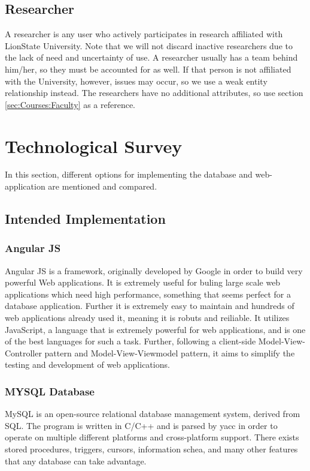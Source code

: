 \documentclass{article}
\begin{document}
  \subsection{Researcher}\label{sec:Courses:Researcher}
    A researcher is any user who actively participates in research affiliated with LionState University.  Note that we will not discard inactive researchers due to the lack of need and uncertainty of use.  A researcher usually has a team behind him/her, so they must be accounted for as well.  If that person is not affiliated with the University, however, issues may occur, so we use a weak entity relationship instead.
    The researchers have no additional attributes, so use section \ref{sec:Courses:Faculty} as a reference.

  \newpage


  \section{Technological Survey}\label{sec:Tech}
    In this section, different options for implementing the database and web-application are mentioned and compared.

    \subsection{Intended Implementation}\label{sec:Tech:intent}

    \subsubsection{Angular JS}
      Angular JS is a framework, originally developed by Google in order to build very powerful Web applications.  It is extremely useful for buling large scale web applications which need high performance, something that seems perfect for a database application.  Further it is extremely easy to maintain and hundreds of web applications already used it, meaning it is robuts and reiliable.  It utilizes JavaScript, a language that is extremely powerful for web applications, and is one of the best languages for such a task.  Further, following a client-side Model-View-Controller pattern and Model-View-Viewmodel pattern, it aims to simplify the testing and development of web applications.

    \subsubsection{MYSQL Database}
      MySQL is an open-source relational database management system, derived from SQL.  The program is written in C/C++ and is parsed by yacc in order to operate on multiple different platforms and cross-platform support.  There exists stored procedures, triggers, cursors, information schea, and many other features that any database can take advantage.
\end{document}
